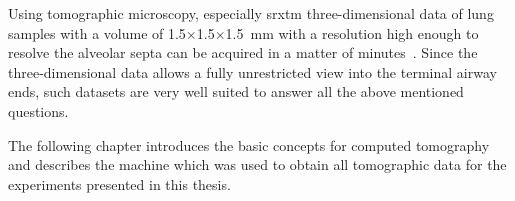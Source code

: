 Using tomographic microscopy, especially \ac{srxtm} three-dimensional data of lung samples with a volume of 1.5$\times$1.5$\times$\SI{1.5}{\milli\meter} with a resolution high enough to resolve the alveolar septa can be acquired in a matter of minutes~\cite{Hintermueller2010}. Since the three-dimensional data allows a fully unrestricted view into the terminal airway ends, such datasets are very well suited to answer all the above mentioned questions.

The following chapter introduces the basic concepts for computed tomography and describes the machine which was used to obtain all tomographic data for the experiments presented in this thesis.
